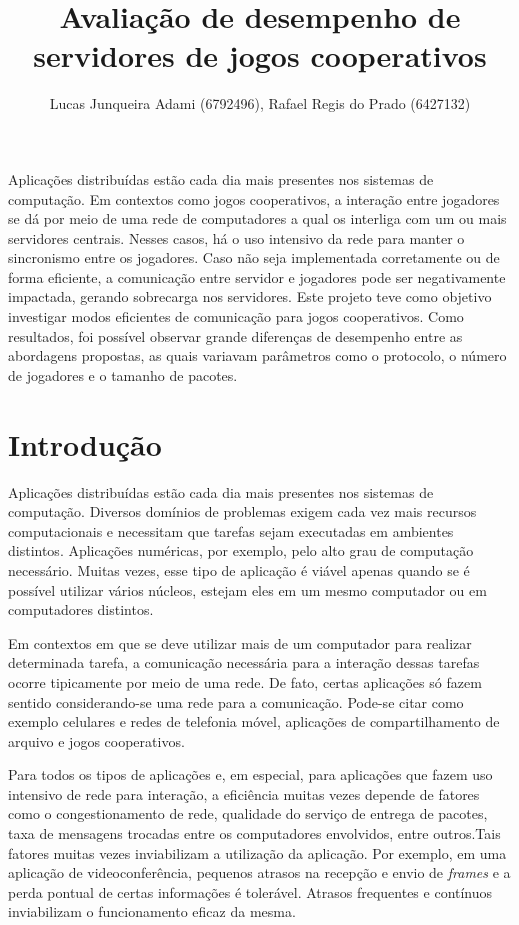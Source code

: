 \documentclass[12pt]{article}
\title{Avaliação de desempenho de servidores de jogos cooperativos}
\author{Lucas Junqueira Adami (6792496)\inst{1}, Rafael Regis do Prado (6427132)\inst{1}}
\begin{document}
 

\maketitle

\begin{resumo} %
Aplicações distribuídas estão cada dia mais presentes nos sistemas de computação. Em contextos como jogos
cooperativos, a interação entre jogadores se dá por meio de uma rede de
computadores a qual os interliga com um ou mais servidores centrais. Nesses
casos, há o uso intensivo da rede para manter o sincronismo entre os jogadores.
Caso não seja implementada corretamente ou de forma eficiente, a comunicação
entre servidor e jogadores pode ser negativamente impactada, gerando sobrecarga
nos servidores. Este projeto teve como objetivo investigar modos eficientes de
comunicação para jogos cooperativos. Como resultados, foi possível observar
grande diferenças de desempenho entre as abordagens propostas, as quais
variavam parâmetros como o protocolo, o número de jogadores e o tamanho de
pacotes.
\end{resumo}

\section{Introdução} \label{sec:introducao}

Aplicações distribuídas estão cada dia mais presentes nos sistemas de computação. Diversos domínios de
problemas exigem cada vez mais recursos computacionais e necessitam que tarefas
sejam executadas em ambientes distintos. Aplicações numéricas, por exemplo,
pelo alto grau de computação necessário. Muitas vezes, esse tipo de aplicação é
viável apenas quando se é possível utilizar vários núcleos, estejam eles em um
mesmo computador ou em computadores distintos.

Em contextos em que se deve utilizar mais de um computador para realizar
determinada tarefa, a comunicação necessária para a interação dessas tarefas
ocorre tipicamente por meio de uma rede. De fato, certas aplicações só fazem
sentido considerando-se uma rede para a comunicação. Pode-se citar como exemplo
celulares e redes de telefonia móvel, aplicações de compartilhamento de arquivo
e jogos cooperativos.

Para todos os tipos de aplicações e, em especial, para aplicações que fazem uso
intensivo de rede para interação, a eficiência muitas vezes depende de fatores
como o congestionamento de rede, qualidade do serviço de entrega de pacotes,
taxa de mensagens trocadas entre os computadores envolvidos, entre outros.Tais
fatores muitas vezes inviabilizam a utilização da aplicação. Por exemplo, em
uma aplicação de videoconferência, pequenos atrasos na recepção e envio de
\textit{frames} e a perda pontual de certas informações é tolerável. Atrasos
frequentes e contínuos inviabilizam o funcionamento eficaz da mesma.
\end{document}
